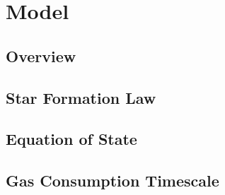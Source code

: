 \chapter{Model}

\section{Overview}


\section{Star Formation Law}


\section{Equation of State}


\section{Gas Consumption Timescale}

